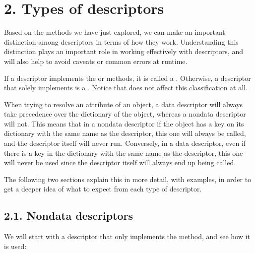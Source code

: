 \documentclass[a4paper,10pt,english]{sphinxmanual}
\begin{document}
\section{2. Types of descriptors}
\label{\detokenize{chapters/6_descriptors/index:types-of-descriptors}}
Based on the methods we have just explored, we can make an important distinction among
descriptors in terms of how they work. Understanding this distinction plays an important
role in working effectively with descriptors, and will also help to avoid caveats or common
errors at runtime.

If a descriptor implements the  or  methods, it is called a . Otherwise, a descriptor that solely implements  is a . Notice that  does not affect this classification at all.

When trying to resolve an attribute of an object, a data descriptor will always take
precedence over the dictionary of the object, whereas a non\sphinxhyphen{}data descriptor will not. This
means that in a non\sphinxhyphen{}data descriptor if the object has a key on its dictionary with the same
name as the descriptor, this one will always be called, and the descriptor itself will never
run. Conversely, in a data descriptor, even if there is a key in the dictionary with the same
name as the descriptor, this one will never be used since the descriptor itself will always
end up being called.

The following two sections explain this in more detail, with examples, in order to get a
deeper idea of what to expect from each type of descriptor.


\subsection{2.1. Non\sphinxhyphen{}data descriptors}
\label{\detokenize{chapters/6_descriptors/index:non-data-descriptors}}
We will start with a descriptor that only implements the  method, and see how
it is used:

\begin{sphinxVerbatim}[commandchars=\\\{\}]
 
       
           
             
         

 
      
\end{sphinxVerbatim}
\end{document}
